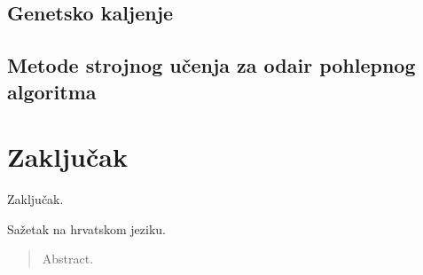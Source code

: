 \documentclass[times, utf8, diplomski, numeric]{fer}
\begin{document}
\section{Genetsko kaljenje}

\section{Metode strojnog učenja za odair pohlepnog algoritma}

\chapter{Zaključak}
Zaključak.




\begin{sazetak}
Sažetak na hrvatskom jeziku.

\end{sazetak}

\begin{abstract}
Abstract.

\end{abstract}
\end{document}
